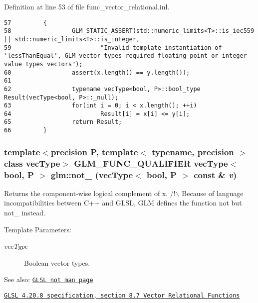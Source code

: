 Definition at line 53 of file func\_\-vector\_\-relational.inl.

\begin{Code}\begin{verbatim}57         {
58                 GLM_STATIC_ASSERT(std::numeric_limits<T>::is_iec559 || std::numeric_limits<T>::is_integer,
59                         "Invalid template instantiation of 'lessThanEqual', GLM vector types required floating-point or integer value types vectors");
60                 assert(x.length() == y.length());
61 
62                 typename vecType<bool, P>::bool_type Result(vecType<bool, P>::_null);
63                 for(int i = 0; i < x.length(); ++i)
64                         Result[i] = x[i] <= y[i];
65                 return Result;
66         }
\end{verbatim}
\end{Code}


\hypertarget{group__core__func__vector__relational_g3f686b22d487d7d06447b15d3c621d2f}{
\subsubsection[not\_\-]{\setlength{\rightskip}{0pt plus 5cm}template$<$precision P, template$<$ typename, precision $>$ class vecType$>$ GLM\_\-FUNC\_\-QUALIFIER vecType$<$ bool, P $>$ glm::not\_\- (vecType$<$ bool, P $>$ const \& {\em v})}}
\label{group__core__func__vector__relational_g3f686b22d487d7d06447b15d3c621d2f}


Returns the component-wise logical complement of x. /!$\backslash$ Because of language incompatibilities between C++ and GLSL, GLM defines the function not but not\_\- instead.

\begin{Desc}
\item[Template Parameters:]
\begin{description}
\item[{\em vecType}]Boolean vector types.\end{description}
\end{Desc}
\begin{Desc}
\item[See also:]\href{http://www.opengl.org/sdk/docs/manglsl/xhtml/not.xml}{\tt GLSL not man page} 

\href{http://www.opengl.org/registry/doc/GLSLangSpec.4.20.8.pdf}{\tt GLSL 4.20.8 specification, section 8.7 Vector Relational Functions} \end{Desc}


